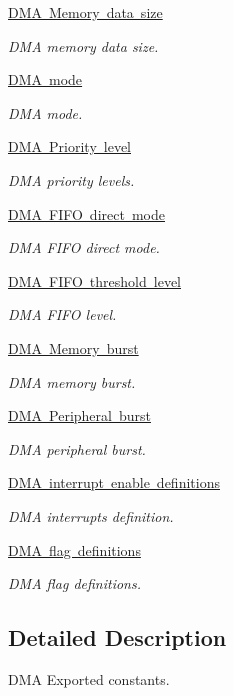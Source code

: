 \begin{DoxyCompactItemize}
\mbox{\hyperlink{group___d_m_a___memory__data__size}{D\+M\+A Memory data size}}
\begin{DoxyCompactList}\small\item\em D\+MA memory data size. \end{DoxyCompactList}\item 
\mbox{\hyperlink{group___d_m_a__mode}{D\+M\+A mode}}
\begin{DoxyCompactList}\small\item\em D\+MA mode. \end{DoxyCompactList}\item 
\mbox{\hyperlink{group___d_m_a___priority__level}{D\+M\+A Priority level}}
\begin{DoxyCompactList}\small\item\em D\+MA priority levels. \end{DoxyCompactList}\item 
\mbox{\hyperlink{group___d_m_a___f_i_f_o__direct__mode}{D\+M\+A F\+I\+F\+O direct mode}}
\begin{DoxyCompactList}\small\item\em D\+MA F\+I\+FO direct mode. \end{DoxyCompactList}\item 
\mbox{\hyperlink{group___d_m_a___f_i_f_o__threshold__level}{D\+M\+A F\+I\+F\+O threshold level}}
\begin{DoxyCompactList}\small\item\em D\+MA F\+I\+FO level. \end{DoxyCompactList}\item 
\mbox{\hyperlink{group___d_m_a___memory__burst}{D\+M\+A Memory burst}}
\begin{DoxyCompactList}\small\item\em D\+MA memory burst. \end{DoxyCompactList}\item 
\mbox{\hyperlink{group___d_m_a___peripheral__burst}{D\+M\+A Peripheral burst}}
\begin{DoxyCompactList}\small\item\em D\+MA peripheral burst. \end{DoxyCompactList}\item 
\mbox{\hyperlink{group___d_m_a__interrupt__enable__definitions}{D\+M\+A interrupt enable definitions}}
\begin{DoxyCompactList}\small\item\em D\+MA interrupts definition. \end{DoxyCompactList}\item 
\mbox{\hyperlink{group___d_m_a__flag__definitions}{D\+M\+A flag definitions}}
\begin{DoxyCompactList}\small\item\em D\+MA flag definitions. \end{DoxyCompactList}\end{DoxyCompactItemize}


\subsection{Detailed Description}
D\+MA Exported constants. 


